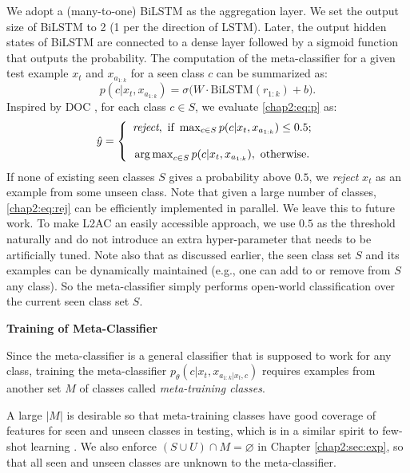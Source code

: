 We adopt a (many-to-one) BiLSTM \cite{hochreiter1997long,schuster1997bidirectional} as the aggregation layer.
We set the output size of BiLSTM to 2 (1 per the direction of LSTM). 
Later, the output hidden states of BiLSTM are connected to a dense layer followed by a sigmoid function that outputs the probability.
The computation of the meta-classifier for a given test example $x_t$ and $x_{a_{1:k}}$ for a seen class $c$ can be summarized as: 
\begin{equation}
    \label{chap2:eq:p}
p(c|x_t, x_{a_{1:k}} )=\sigma\big(W\cdot \text{BiLSTM}(r_{1:k})+b\big).
\end{equation}
Inspired by DOC \cite{shu-xu-liu:2017:EMNLP2017}, 
for each class $c \in S$, we evaluate \ref{chap2:eq:p} as:
\begin{equation} 
    \label{chap2:eq:rej}
        \hat{y} = \left\{
        \begin{array}{c}
        \textit{reject}, \text{ if } \max_{c \in S} p(c|x_t, x_{a_{1:k}} ) \le 0.5 ;\\
        \\
        \operatorname*{arg\,max}_{c \in S} p(c|x_t, x_{a_{1:k}} ) ,\text{ otherwise.}
        \end{array} \right.
\end{equation}
If none of existing seen classes $S$ gives a probability above $0.5$, we \emph{reject} $x_t$ as an example from some unseen class.
Note that given a large number of classes, \ref{chap2:eq:rej} can be efficiently implemented in parallel. We leave this to future work.
To make L2AC an easily accessible approach, we use $0.5$ as the threshold naturally and do not introduce an extra hyper-parameter that needs to be artificially tuned.
Note also that as discussed earlier, the seen class set $S$ and its examples can be dynamically maintained (e.g., one can add to or remove from $S$ any class). So the meta-classifier simply performs open-world classification over the current seen class set $S$.

\textbf{Training of Meta-Classifier}
\label{chap2:sec:train}

Since the meta-classifier is a general classifier that is supposed to work for any class,
training the meta-classifier $p_\theta(c|x_t, x_{a_{1:k}|x_t, c} )$
requires examples from another set $M$ of classes called \textit{meta-training classes}.

A large $|M|$ is desirable so that meta-training classes have good coverage of features for seen and unseen classes in testing, which is in a similar spirit to few-shot learning \cite{lake2011one}. 
We also enforce $ (S\cup U) \cap M=\varnothing$ in Chapter \ref{chap2:sec:exp}, so that all seen and unseen classes are unknown to the meta-classifier.

